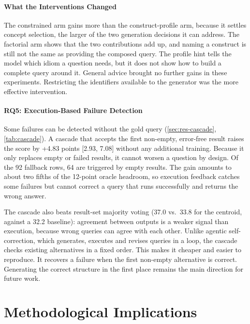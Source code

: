 \paragraph{What the Interventions Changed}

The constrained arm gains more than the construct-profile arm, because it settles concept selection, the larger of the two generation decisions it can address.
The factorial arm shows that the two contributions add up, and naming a construct is still not the same as providing the composed query.
The profile hint tells the model which idiom a question needs, but it does not show how to build a complete query around it.
General advice brought no further gains in these experiments.
Restricting the identifiers available to the generator was the more effective intervention.

\paragraph{RQ5: Execution-Based Failure Detection}

\label{sec:disc-rq5}

Some failures can be detected without the gold query (\cref{sec:res-cascade}, \cref{tab:cascade}).
A cascade that accepts the first non-empty, error-free result raises the score by +4.83 points [2.93, 7.08] without any additional training.
Because it only replaces empty or failed results, it cannot worsen a question by design.
Of the 92 fallback rows, 64 are triggered by empty results.
The gain amounts to about two fifths of the 12-point oracle headroom, so execution feedback catches some failures but cannot correct a query that runs successfully and returns the wrong answer.

The cascade also beats result-set majority voting (37.0 vs.\ 33.8 for the centroid, against a 32.2 baseline): agreement between outputs is a weaker signal than execution, because wrong queries can agree with each other.
Unlike agentic self-correction, which generates, executes and revises queries in a loop, the cascade checks existing alternatives in a fixed order.
This makes it cheaper and easier to reproduce.
It recovers a failure when the first non-empty alternative is correct.
Generating the correct structure in the first place remains the main direction for future work.

\section{Methodological
Implications}

